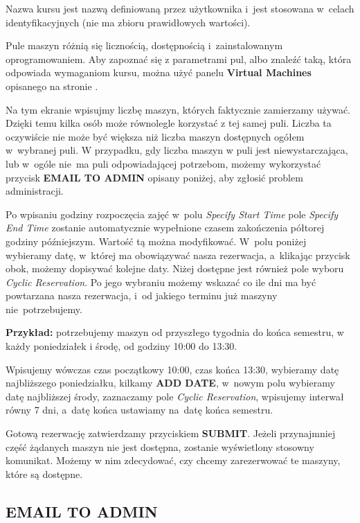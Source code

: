 \documentclass[a5paper, twoside, openany]{book}
\begin{document}
  Nazwa kursu jest nazwą definiowaną przez użytkownika i~jest stosowana w~celach identyfikacyjnych (nie ma zbioru prawidłowych wartości).

  Pule maszyn różnią się licznością, dostępnością i~zainstalowanym oprogramowaniem. Aby zapoznać się z parametrami pul, albo znaleźć taką, która odpowiada wymaganiom kursu, można użyć panelu \textbf{Virtual Machines} opisanego na stronie \pageref{VMs}.

  Na tym ekranie wpisujmy liczbę maszyn, których faktycznie zamierzamy używać. Dzięki temu kilka osób może równolegle korzystać z tej samej puli. Liczba ta oczywiście nie może być większa niż liczba maszyn dostępnych ogółem w~wybranej puli. W przypadku, gdy liczba maszyn w puli jest niewystarczająca, lub w~ogóle nie~ma puli odpowiadającej potrzebom, możemy wykorzystać przycisk \textbf{EMAIL TO ADMIN} opisany poniżej, aby zgłosić problem administracji.

  Po wpisaniu godziny rozpoczęcia zajęć w~polu \textit{Specify Start Time} pole \textit{Specify End Time} zostanie automatycznie wypełnione czasem zakończenia półtorej godziny późniejszym. Wartość tą można modyfikować. W~polu poniżej wybieramy datę, w~której ma obowiązywać nasza rezerwacja, a~klikając przycisk obok, możemy dopisywać kolejne daty. Niżej dostępne jest również pole wyboru \textit{Cyclic Reservation}. Po jego wybraniu możemy wskazać co ile dni ma być powtarzana nasza rezerwacja, i~od jakiego terminu już maszyny nie~potrzebujemy.

  \begin{framed}\textbf{Przykład:} potrzebujemy maszyn od przyszłego tygodnia do końca semestru, w każdy poniedziałek i środę, od godziny 10:00 do 13:30.
  
  Wpisujemy wówczas czas początkowy 10:00, czas końca 13:30, wybieramy datę najbliższego poniedziałku, kilkamy \textbf{ADD DATE}, w~nowym polu wybieramy datę najbliższej środy, zaznaczamy pole \textit{Cyclic Reservation}, wpisujemy interwał równy 7 dni, a~datę końca ustawiamy na~datę końca semestru.
  \end{framed}

  Gotową rezerwację zatwierdzamy przyciskiem \textbf{SUBMIT}. Jeżeli przynajmniej część żądanych maszyn nie jest dostępna, zostanie wyświetlony stosowny komunikat. Możemy w nim zdecydować, czy chcemy zarezerwować te maszyny, które są dostępne.

  \subsection{EMAIL TO ADMIN}
\end{document}
